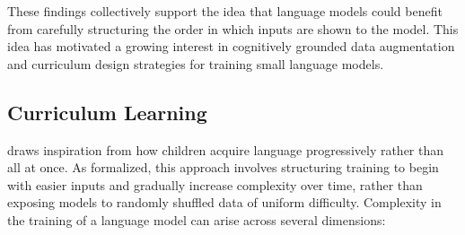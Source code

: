 These findings collectively support the idea that language models could benefit from carefully structuring the order in which inputs are shown to the model. This idea has motivated a growing interest in cognitively grounded data augmentation and curriculum design strategies for training small language models.

\subsection{Curriculum Learning}

 draws inspiration from how children acquire language progressively rather than all at once. As \citet{bengio2009curriculum} formalized, this approach involves structuring training to begin with easier inputs and gradually increase complexity over time, rather than exposing models to randomly shuffled data of uniform difficulty. Complexity in the training of a language model can arise across several dimensions:



